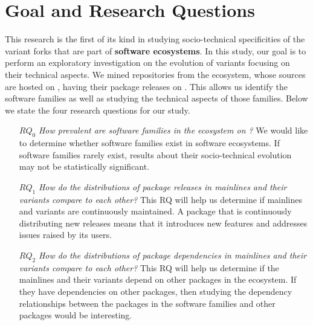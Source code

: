 \section{Goal and Research Questions}
This research is the first of its kind in studying socio-technical specificities of the variant forks that are part of \textbf{software ecosystems}. In this study, our goal is to perform an exploratory investigation on the evolution of variants focusing on their technical aspects. We mined repositories from the \js ecosystem, whose sources are hosted on \gh, having their package releases on \npm. This allows us identify the software families as well as studying the technical aspects of those families.
Below we state the four research questions for our study.
\begin{itemize}
\item[\textbf{$RQ_0$}] \textit{How prevalent are software families in the \js ecosystem on \gh?}
We would like to determine whether software families exist in software ecosystems. If software families rarely exist, results about their socio-technical evolution may not be statistically significant.
\item[\textbf{$RQ_1$}] \textit{How do the distributions of package releases in mainlines and their variants compare to each other?}
This RQ will help us determine if mainlines and variants are continuously maintained. A package that is continuously distributing new releases means that it introduces new features and addresses issues raised by its users.


\item[\textbf{$RQ_2$}] \textit{How do the distributions of package dependencies in mainlines and their variants compare to each other?}
This RQ will help us determine if the mainlines and their variants depend on other packages in the \np ecosystem. If they have dependencies on other packages, then studying the dependency relationships between the packages in the software families and other packages would be interesting.


\end{itemize}
